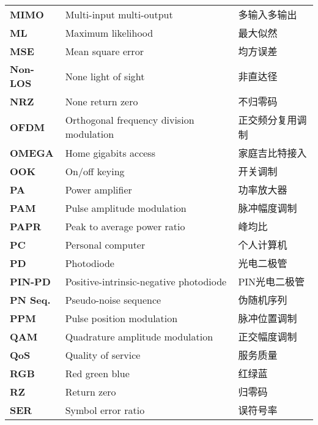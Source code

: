\begin{terminology}
\begin{longtable}{lll}
        \bf{MIMO}        &	Multi-input multi-output                  &	多输入多输出	\\
        \bf{ML}          &	Maximum likelihood                        &	最大似然	\\
        \bf{MSE}         &  Mean square error                         & 均方误差    \\
        \bf{Non-LOS}     &	None light of sight                       &	非直达径	\\
        \bf{NRZ}         &	None return zero                          &	不归零码	\\
        \bf{OFDM}        &	Orthogonal frequency division modulation  &	正交频分复用调制	\\
        \bf{OMEGA}       &	Home gigabits access                      &	家庭吉比特接入	\\
        \bf{OOK}         &	On/off keying                             &	开关调制	\\
        \bf{PA}          &   Power amplifier                          & 功率放大器  \\
        \bf{PAM}         &	Pulse amplitude modulation                &	脉冲幅度调制	\\
        \bf{PAPR}        &	Peak to average power ratio               &	峰均比	\\
        \bf{PC}          &   Personal computer                        & 个人计算机  \\
        \bf{PD}          &	Photodiode                                &	光电二极管	\\
        \bf{PIN-PD}      &	Positive-intrinsic-negative photodiode    &	PIN光电二极管	\\
        \bf{PN Seq.}     &	Pseudo-noise sequence                     &	伪随机序列	\\
        \bf{PPM}         &	Pulse position modulation                 &	脉冲位置调制	\\
        \bf{QAM}         &	Quadrature amplitude modulation           &	正交幅度调制	\\
        \bf{QoS}         &	Quality of service                        &	服务质量	\\
        \bf{RGB}         &	Red green blue                            &	红绿蓝	\\
        \bf{RZ}          &	Return zero                               &	归零码	\\
        \bf{SER}         &	Symbol error ratio                        &	误符号率 \\

\end{longtable}
\end{terminology}
